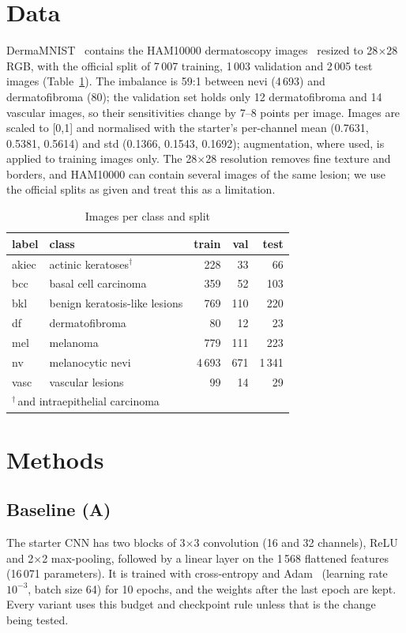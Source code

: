 \documentclass[conference]{IEEEtran}
\begin{document}
\section{Data}
DermaMNIST~\cite{medmnistv2} contains the HAM10000 dermatoscopy images~\cite{tschandl2018ham} resized to
28$\times$28 RGB, with the official split of 7\,007 training, 1\,003 validation and 2\,005 test images
(Table~\ref{tab:data}). The imbalance is 59:1 between nevi (4\,693) and dermatofibroma (80); the validation set
holds only 12 dermatofibroma and 14 vascular images, so their sensitivities change by 7--8 points per image.
Images are scaled to [0,1] and normalised with the starter's per-channel mean (0.7631, 0.5381, 0.5614) and
std (0.1366, 0.1543, 0.1692); augmentation, where used, is applied to training images only.
The 28$\times$28 resolution removes fine texture and borders, and HAM10000 can contain several images of the
same lesion; we use the official splits as given and treat this as a limitation.

\begin{table}[t]
\caption{Images per class and split}
\label{tab:data}
\centering
\begin{tabular}{llrrr}
\toprule
label & class & train & val & test \\
\midrule
akiec & actinic keratoses$^{\dagger}$ & 228 & 33 & 66 \\
bcc & basal cell carcinoma & 359 & 52 & 103 \\
bkl & benign keratosis-like lesions & 769 & 110 & 220 \\
df & dermatofibroma & 80 & 12 & 23 \\
mel & melanoma & 779 & 111 & 223 \\
nv & melanocytic nevi & 4\,693 & 671 & 1\,341 \\
vasc & vascular lesions & 99 & 14 & 29 \\
\bottomrule
\multicolumn{5}{l}{\footnotesize $^{\dagger}$\,and intraepithelial carcinoma}
\end{tabular}
\end{table}

\section{Methods}
\subsection{Baseline (A)}
The starter CNN has two blocks of 3$\times$3 convolution (16 and 32 channels), ReLU and 2$\times$2 max-pooling,
followed by a linear layer on the 1\,568 flattened features (16\,071 parameters). It is trained with
cross-entropy and Adam~\cite{kingma2015adam} (learning rate $10^{-3}$, batch size 64) for 10 epochs, and the
weights after the last epoch are kept. Every variant uses this budget and checkpoint rule unless that is the
change being tested.
\end{document}
